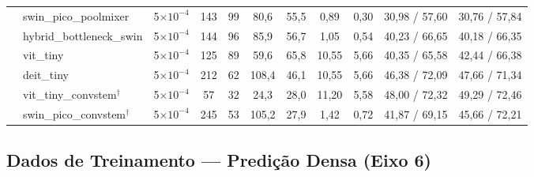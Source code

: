 \documentclass[conference]{IEEEtran}
\begin{document}
\begin{table}[!t]
{\begin{tabular}{@{}llccccccccc@{}}
 & swin\_pico\_poolmixer & 5$\times10^{-4}$ & 143 & 99 & 80,6 & 55,5 & 0,89 & 0,30 & 30,98 / 57,60 & 30,76 / 57,84 \\
 & hybrid\_bottleneck\_swin & 5$\times10^{-4}$ & 144 & 96 & 85,9 & 56,7 & 1,05 & 0,54 & 40,23 / 66,65 & 40,18 / 66,35 \\
 & vit\_tiny & 5$\times10^{-4}$ & 125 & 89 & 59,6 & 65,8 & 10,55 & 5,66 & 40,35 / 65,58 & 42,44 / 66,38 \\
 & deit\_tiny & 5$\times10^{-4}$ & 212 & 62 & 108,4 & 46,1 & 10,55 & 5,66 & 46,38 / 72,09 & 47,66 / 71,34 \\
 & vit\_tiny\_convstem$^\dagger$ & 5$\times10^{-4}$ & 57 & 32 & 24,3 & 28,0 & 11,20 & 5,58 & 48,00 / 72,32 & 49,29 / 72,46 \\
 & swin\_pico\_convstem$^\dagger$ & 5$\times10^{-4}$ & 245 & 53 & 105,2 & 27,9 & 1,42 & 0,72 & 41,87 / 69,15 & 45,66 / 72,21 \\
\bottomrule
\end{tabular}%
}
\renewcommand{\arraystretch}{1}
\end{table}

\subsection{Dados de Treinamento — Predição Densa (Eixo 6)}
\label{sec:apendice_treinamento_fase7}
\end{document}
